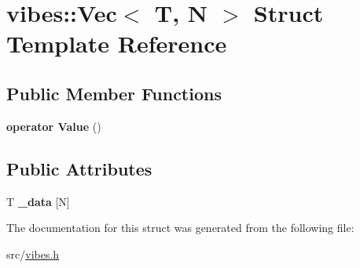 \hypertarget{structvibes_1_1_vec}{}\section{vibes\+:\+:Vec$<$ T, N $>$ Struct Template Reference}
\label{structvibes_1_1_vec}
\subsection*{Public Member Functions}
\begin{DoxyCompactItemize}
\item 
\mbox{\label{structvibes_1_1_vec_a95a3e87947f7608c5372568df24a2c05}} 
{\bfseries operator Value} ()
\end{DoxyCompactItemize}
\subsection*{Public Attributes}
\begin{DoxyCompactItemize}
\item 
\mbox{\label{structvibes_1_1_vec_a7444168843b74f507a797c0b1b6e1380}} 
T {\bfseries \+\_\+data} \mbox{[}N\mbox{]}
\end{DoxyCompactItemize}


The documentation for this struct was generated from the following file\+:\begin{DoxyCompactItemize}
\item 
src/\hyperlink{vibes_8h}{vibes.\+h}\end{DoxyCompactItemize}

